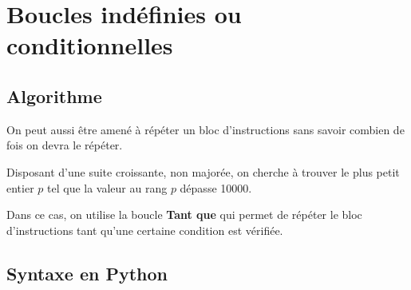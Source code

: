 \section{Boucles indéfinies ou conditionnelles}

\subsection{Algorithme}

On peut aussi être amené à répéter un bloc d'instructions sans savoir combien de fois on devra le 
répéter. 

Disposant d'une suite croissante, non majorée, on cherche à trouver le plus petit entier $p$ 
tel que la valeur au rang $p$ dépasse 10000.

Dans ce cas, on utilise la boucle \textbf{Tant que} qui permet de répéter le bloc d'instructions 
tant qu'une certaine condition est vérifiée.


\vspace{1cm}



\subsection{Syntaxe en Python}


